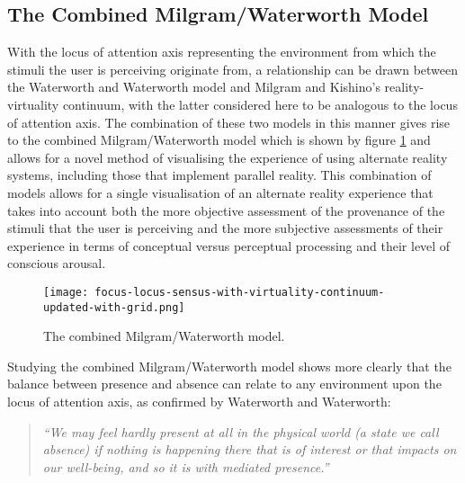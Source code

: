 \subsection{The Combined Milgram/Waterworth Model}
\label{combined-milgram-waterworth-model}
With the locus of attention axis representing the environment from which the stimuli the user is perceiving originate from, a relationship can be drawn between the Waterworth and Waterworth model and Milgram and Kishino's reality-virtuality continuum, with the latter considered here to be analogous to the locus of attention axis. The combination of these two models in this manner gives rise to the combined Milgram/Waterworth model which is shown by figure \ref{focus-locus-sensus-with-virtuality-continuum} and allows for a novel method of visualising the experience of using alternate reality systems, including those that implement parallel reality. This combination of models allows for a single visualisation of an alternate reality experience that takes into account both the more objective assessment of the provenance of the stimuli that the user is perceiving and the more subjective assessments of their experience in terms of conceptual versus perceptual processing and their level of conscious arousal.

\begin{figure}[h]
	\begin{center}
		\texttt{[image: focus-locus-sensus-with-virtuality-continuum-updated-with-grid.png]}
		\caption{The combined Milgram/Waterworth model.}
		\label{focus-locus-sensus-with-virtuality-continuum}
	\end{center}	
\end{figure}

Studying the combined Milgram/Waterworth model shows more clearly that the balance between presence and absence can relate to any environment upon the locus of attention axis, as confirmed by Waterworth and Waterworth:

\begin{quote}
	\textit{``We may feel hardly present at all in the physical world (a state we call absence) if nothing is happening there that is of interest or that impacts on our well-being, and so it is with mediated presence.''}~\cite{Waterworth2014}
\end{quote}


